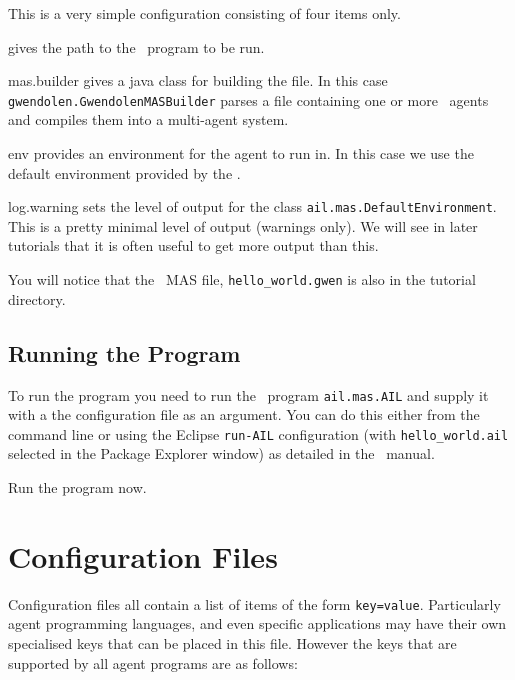 This is a very simple configuration consisting of four items only.
\begin{description}
\item[mas.file] gives the path to the \gwendolen\ program to be run.
\begin{sloppypar}
\item[mas.builder] gives a java class for building the file.  In this case \texttt{gwendolen.GwendolenMASBuilder} parses a file containing one or more \gwendolen\ agents and compiles them into a multi-agent system.
\item[env] provides an environment for the agent to run in.  In this case we use the default environment provided by the \ail.
\item[log.warning] sets the level of output for the class \texttt{ail.mas.DefaultEnvironment}.  This is a pretty minimal level of output (warnings only).  We will see in later tutorials that it is often useful to get more output than this.
\end{sloppypar}
\end{description}
You will notice that the \gwendolen\ MAS file, \texttt{hello\_world.gwen} is also in the tutorial directory.

\subsection{Running the Program}

To run the program you need to run the \java\ program \texttt{ail.mas.AIL} and supply it with a the configuration file as an argument.  You can do this either from the command line or using the Eclipse \texttt{run-AIL} configuration (with \texttt{hello\_world.ail} selected in the Package Explorer window) as detailed in the \mcapl\ manual.

Run the program now.

\section{Configuration Files}

Configuration files all contain a list of items of the form \texttt{key=value}.  Particularly agent programming languages, and even specific applications may have their own specialised keys that can be placed in this file.  However the keys that are supported by all agent programs are as follows:

